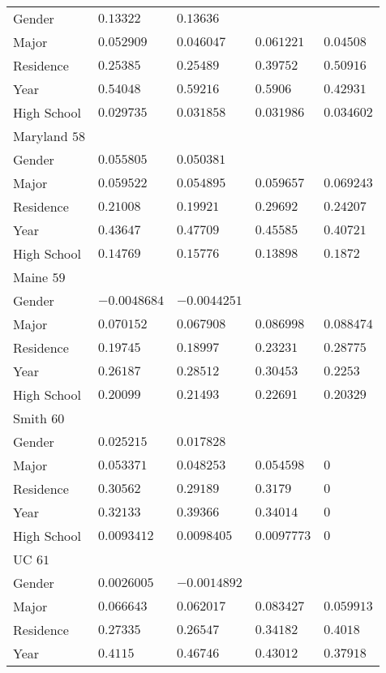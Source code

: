 \begin{center}
\begin{longtable}{|l|l|l|l|l|}
Gender & $0.13322$ & $0.13636$ & & \\
Major & $0.052909$ & $0.046047$ & $0.061221$ & $0.04508$ \\
Residence & $0.25385$ & $0.25489$ & $0.39752$ & $0.50916$ \\
Year & $0.54048$ & $0.59216$ & $0.5906$ & $0.42931$ \\
High School & $0.029735$ & $0.031858$ & $0.031986$ & $0.034602$ \\ \hline \hline
Maryland $58$ & & &   \\ \hline
Gender & $0.055805$ & $0.050381$ & & \\
Major & $0.059522$ & $0.054895$ & $0.059657$ & $0.069243$ \\
Residence & $0.21008$ & $0.19921$ & $0.29692$ & $0.24207$ \\
Year & $0.43647$ & $0.47709$ & $0.45585$ & $0.40721$ \\
High School & $0.14769$ & $0.15776$ & $0.13898$ & $0.1872$ \\ \hline \hline
Maine $59$ & & &   \\ \hline
Gender & $-0.0048684$ & $-0.0044251$ & & \\
Major & $0.070152$ & $0.067908$ & $0.086998$ & $0.088474$ \\
Residence & $0.19745$ & $0.18997$ & $0.23231$ & $0.28775$ \\
Year & $0.26187$ & $0.28512$ & $0.30453$ & $0.2253$ \\
High School & $0.20099$ & $0.21493$ & $0.22691$ & $0.20329$ \\ \hline \hline
Smith $60$ & & &   \\ \hline
Gender & $0.025215$ & $0.017828$ & & \\
Major & $0.053371$ & $0.048253$ & $0.054598$ & $0$ \\
Residence & $0.30562$ & $0.29189$ & $0.3179$ & $0$ \\
Year & $0.32133$ & $0.39366$ & $0.34014$ & $0$ \\
High School & $0.0093412$ & $0.0098405$ & $0.0097773$ & $0$ \\ \hline \hline
UC $61$ & & &   \\ \hline
Gender & $0.0026005$ & $-0.0014892$ & & \\
Major & $0.066643$ & $0.062017$ & $0.083427$ & $0.059913$ \\
Residence & $0.27335$ & $0.26547$ & $0.34182$ & $0.4018$ \\
Year & $0.4115$ & $0.46746$ & $0.43012$ & $0.37918$ \\

\end{longtable}
\end{center}
